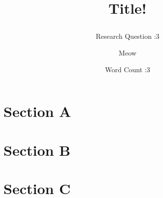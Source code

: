 \documentclass{article}
\title{Title!
\subtitle{Research Question :3}}
\author{Meow}
\date{Word Count :3}
\numberwithin{equation}{section}
\numberwithin{figure}{section}
\begin{document}
\clearpage\maketitle
\thispagestyle{empty}
\newpage

\tableofcontents
\newpage

\renewcommand{\thesection}{\arabic{section}}

\pagestyle{fancy}
\fancyhf{}
\fancyhead[R]{\thepage}

\section{Section A}


\section{Section B}


\section{Section C} 


\printbibliography
\end{document}
